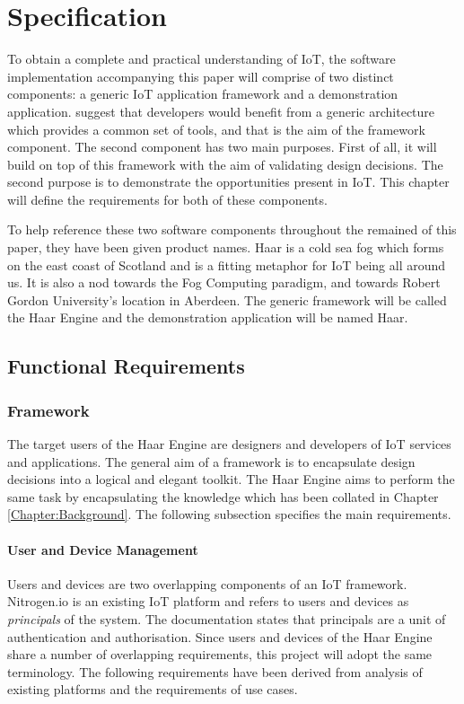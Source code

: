 \chapter{Specification}
  To obtain a complete and practical understanding of IoT, the software implementation accompanying this paper will comprise of two distinct components: a generic IoT application framework and a demonstration application. \citet{interoperability:2015} suggest that developers would benefit from a generic architecture which provides a common set of tools, and that is the aim of the framework component. The second component has two main purposes. First of all, it will build on top of this framework with the aim of validating design decisions. The second purpose is to demonstrate the opportunities present in IoT. This chapter will define the requirements for both of these components.

  To help reference these two software components throughout the remained of this paper, they have been given product names. Haar is a cold sea fog which forms on the east coast of Scotland and is a fitting metaphor for IoT being all around us. It is also a nod towards the Fog Computing paradigm, and towards Robert Gordon University's location in Aberdeen. The generic framework will be called the Haar Engine and the demonstration application will be named Haar.

  \section{Functional Requirements}
    \subsection{Framework}
      The target users of the Haar Engine are designers and developers of IoT services and applications. The general aim of a framework is to encapsulate design decisions into a logical and elegant toolkit. The Haar Engine aims to perform the same task by encapsulating the knowledge which has been collated in Chapter \ref{Chapter:Background}. The following subsection specifies the main requirements.

      \subsubsection{User and Device Management}
        Users and devices are two overlapping components of an IoT framework. Nitrogen.io is an existing IoT platform and refers to users and devices as \emph{principals} of the system. The documentation states that principals are a unit of authentication and authorisation. Since users and devices of the Haar Engine share a number of overlapping requirements, this project will adopt the same terminology. The following requirements have been derived from analysis of existing platforms and the requirements of use cases.

